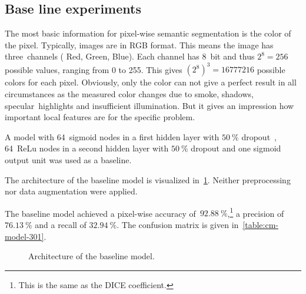 
\subsection{Base line experiments}\label{sec:ap3}

The most basic information for pixel-wise semantic segmentation is the color of
the pixel. Typically, images are in RGB format. This means the image has
three~channels ({\color{red} R}ed, {\color{green} G}reen, {\color{blue} B}lue).
Each channel has 8~bit and thus $2^8 = 256$ possible values, ranging from 0 to
255. This gives ${(2^8)}^3 = \num{16777216}$ possible colors for each pixel.
Obviously, only the color can not give a perfect result in all circumstances as
the measured color changes due to smoke, shadows, specular~highlights and
insufficient illumination. But it gives an impression how important local
features are for the specific problem.

A model with 64~sigmoid nodes in a first hidden layer with $\SI{50}{\percent}$
dropout~\cite{srivastava2014dropout}, 64~ReLu nodes in a second hidden layer
with $\SI{50}{\percent}$ dropout and one sigmoid output unit was used as a
baseline.

The architecture of the baseline model is visualized
in~\cref{fig:baseline-architecture}. Neither preprocessing nor data
augmentation were applied.

The baseline model achieved a pixel-wise accuracy
of~$\SI{92.88}{\percent}$,\footnote{This is the same as the DICE coefficient.}
a precision of $\SI{76.13}{\percent}$ and a recall of $\SI{32.94}{\percent}$.
The confusion matrix is given in~\cref{table:cm-model-301}.

\begin{figure}[ht]
    \centering
    
    \caption{Architecture of the baseline model.}
    \label{fig:baseline-architecture}
\end{figure}
